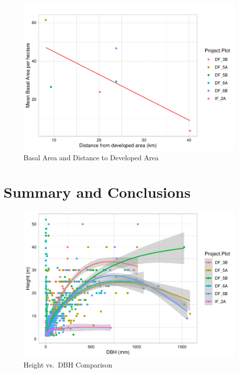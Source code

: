 \documentclass[
  12pt,
]{article}
\begin{document}
\begin{figure}
\centering
\includegraphics{GoldenGriffithsKnierMalinowski_ENV872_Project_files/figure-latex/fig 9-1.pdf}
\caption{Basal Area and Distance to Developed Area}
\end{figure}

\newpage

\hypertarget{summary-and-conclusions}{%
\section{Summary and Conclusions}\label{summary-and-conclusions}}

\begin{figure}
\centering
\includegraphics{GoldenGriffithsKnierMalinowski_ENV872_Project_files/figure-latex/plot of DBH vs height-1.pdf}
\caption{Height vs.~DBH Comparison}
\end{figure}
\end{document}
